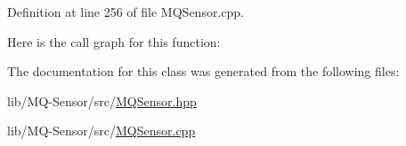 Definition at line 256 of file M\+Q\+Sensor.\+cpp.



Here is the call graph for this function\+:




The documentation for this class was generated from the following files\+:\begin{DoxyCompactItemize}
\item 
lib/\+M\+Q-\/\+Sensor/src/\hyperlink{_m_q_sensor_8hpp}{M\+Q\+Sensor.\+hpp}\item 
lib/\+M\+Q-\/\+Sensor/src/\hyperlink{_m_q_sensor_8cpp}{M\+Q\+Sensor.\+cpp}\end{DoxyCompactItemize}
